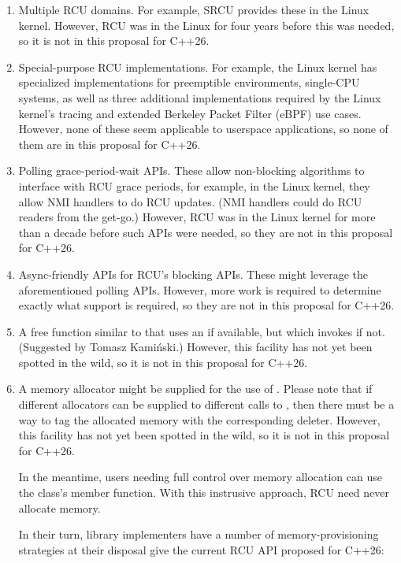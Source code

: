 \begin{enumerate}
\item	Multiple RCU domains.
	For example, SRCU provides these in the Linux kernel.
	However, RCU was in the Linux for four years before
	this was needed, so it is not in this proposal for C++26.
\item	Special-purpose RCU implementations.
	For example, the Linux kernel has specialized implementations
	for preemptible environments, single-CPU systems,
	as well as three additional implementations required by
	the Linux kernel's tracing and extended Berkeley Packet
	Filter (eBPF) use cases.
	However, none of these seem applicable to userspace applications,
	so none of them are in this proposal for C++26.
\item	Polling grace-period-wait APIs.
	These allow non-blocking algorithms to interface with RCU
	grace periods, for example, in the Linux kernel, they allow
	NMI handlers to do RCU updates.
	(NMI handlers could do RCU readers from the get-go.)
	However, RCU was in the Linux kernel for more than a decade before
	such APIs were needed, so they are not in this proposal for C++26.
\item	Async-friendly APIs for RCU's blocking APIs.
	These might leverage the aforementioned polling APIs.
	However, more work is required to determine exactly what support
	is required, so they are not in this proposal for C++26.
\item	A free function similar to  that uses
	an  if available, but which invokes
	 if not.
	(Suggested by Tomasz Kami\'{n}ski.)
	However, this facility has not yet been spotted in the wild,
	so it is not in this proposal for C++26.
\item	A memory allocator might be supplied for the use of
	.
	Please note that if different allocators can be supplied to
	different calls to , then there must be a way
	to tag the allocated memory with the corresponding deleter.
	However, this facility has not yet been spotted in the wild,
	so it is not in this proposal for C++26.

	In the meantime, users needing full control over memory allocation
	can use the  class's 
	member function.
	With this instrusive approach, RCU need never allocate memory.

	In their turn, library implementers have a number of
	 memory-provisioning strategies at their
	disposal give the current RCU API proposed for C++26:


\end{enumerate}
